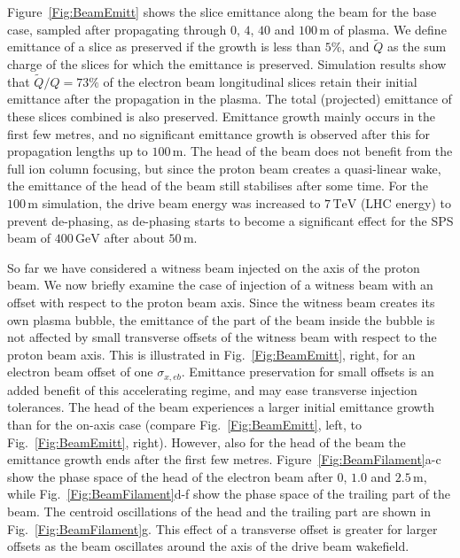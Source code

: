 \documentclass[aps,prstab,reprint,amsmath,amssymb,groupedaddress]{revtex4-1}
\newcommand{\unit}[1]{\,\mathrm{#1}}
\begin{document}
Figure~\ref{Fig:BeamEmitt} shows the slice emittance along the beam for the base case, sampled after propagating through
$0$, $4$, $40$ and $100\unit{m}$ of plasma. We define emittance of a slice as preserved if the growth is less than
$5\%$, and $\widetilde{Q}$ as the sum charge of the slices for which the emittance is preserved. Simulation results show
that $\widetilde{Q}/Q = 73\%$ of the electron beam longitudinal slices retain their initial emittance after the
propagation in the plasma. The total (projected) emittance of these slices combined is also preserved. Emittance growth
mainly occurs in the first few metres, and no significant emittance growth is observed after this for propagation
lengths up to $100\unit{m}$. The head of the beam does not benefit from the full ion column focusing, but since the
proton beam creates a quasi-linear wake, the emittance of the head of the beam still stabilises after some time. For the
$100\unit{m}$ simulation, the drive beam energy was increased to $7\unit{TeV}$ (LHC energy) to prevent de-phasing, as
de-phasing starts to become a significant effect for the SPS beam of $400\unit{GeV}$ after about $50\unit{m}$.

So far we have considered a witness beam injected on the axis of the proton beam. We now briefly examine the case of
injection of a witness beam with an offset with respect to the proton beam axis. Since the witness beam creates its own
plasma bubble, the emittance of the part of the beam inside the bubble is not affected by small transverse offsets of
the witness beam with respect to the proton beam axis. This is illustrated in Fig.~\ref{Fig:BeamEmitt}, right, for an
electron beam offset of one $\sigma_{x,eb}$. Emittance preservation for small offsets is an added benefit of this
accelerating regime, and may ease transverse injection tolerances. The head of the beam experiences a larger initial
emittance growth than for the on-axis case (compare Fig.~\ref{Fig:BeamEmitt}, left, to Fig.~\ref{Fig:BeamEmitt}, right).
However, also for the head of the beam the emittance growth ends after the first few metres.
Figure~\ref{Fig:BeamFilament}a-c show the phase space of the head of the electron beam after $0$, $1.0$ and
$2.5\unit{m}$, while Fig.~\ref{Fig:BeamFilament}d-f show the phase space of the trailing part of the beam. The
centroid oscillations of the head and the trailing part are shown in Fig.~\ref{Fig:BeamFilament}g. This effect of a
transverse offset is greater for larger offsets as the beam oscillates around the axis of the drive beam wakefield.
\end{document}
